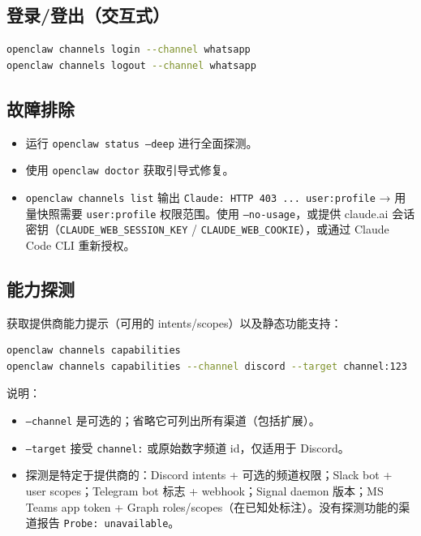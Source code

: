 \subsection{登录/登出（交互式）}


\begin{lstlisting}[language=bash]
openclaw channels login --channel whatsapp
openclaw channels logout --channel whatsapp
\end{lstlisting}


\subsection{故障排除}


\begin{itemize}
  \item 运行 \texttt{openclaw status --deep} 进行全面探测。
  \item 使用 \texttt{openclaw doctor} 获取引导式修复。
  \item \texttt{openclaw channels list} 输出 \texttt{Claude: HTTP 403 ... user:profile} → 用量快照需要 \texttt{user:profile} 权限范围。使用 \texttt{--no-usage}，或提供 claude.ai 会话密钥（\texttt{CLAUDE\_WEB\_SESSION\_KEY} / \texttt{CLAUDE\_WEB\_COOKIE}），或通过 Claude Code CLI 重新授权。
\end{itemize}


\subsection{能力探测}


获取提供商能力提示（可用的 intents/scopes）以及静态功能支持：

\begin{lstlisting}[language=bash]
openclaw channels capabilities
openclaw channels capabilities --channel discord --target channel:123
\end{lstlisting}


说明：

\begin{itemize}
  \item \texttt{--channel} 是可选的；省略它可列出所有渠道（包括扩展）。
  \item \texttt{--target} 接受 \texttt{channel:} 或原始数字频道 id，仅适用于 Discord。
  \item 探测是特定于提供商的：Discord intents + 可选的频道权限；Slack bot + user scopes；Telegram bot 标志 + webhook；Signal daemon 版本；MS Teams app token + Graph roles/scopes（在已知处标注）。没有探测功能的渠道报告 \texttt{Probe: unavailable}。
\end{itemize}


